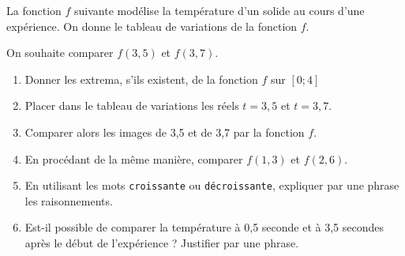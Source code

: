 
La fonction $f$ suivante modélise la température d'un solide au cours d'une expérience. On donne le tableau de variations de la fonction $f$.



On souhaite comparer $f(3,5)$ et $f(3,7)$.
\begin{enumerate}
\item Donner les extrema, s'ils existent, de la fonction $f$ sur $[0;4]$
\item Placer dans le tableau de variations les réels $t =3,5$ et $t =3,7$.
\item Comparer alors les images de 3,5 et de 3,7 par la fonction $f$.
\item En procédant de la même manière, comparer $f(1,3)$ et $f(2,6)$.
\item En utilisant les mots \texttt{croissante} ou  \texttt{décroissante}, expliquer par une phrase les raisonnements.
\item Est-il possible de comparer la température à 0,5 seconde et à 3,5 secondes après le début de l'expérience ? Justifier par une phrase.
\end{enumerate}